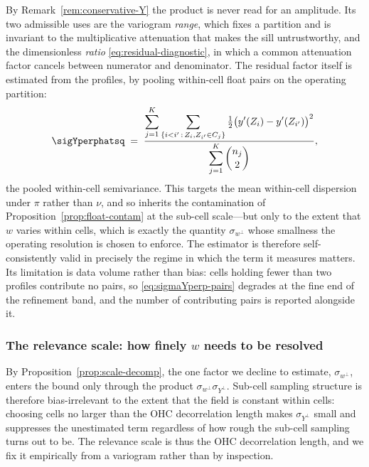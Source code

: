 By Remark~\ref{rem:conservative-Y} the product is never read for an
amplitude. Its two admissible uses are the variogram \emph{range}, which
fixes a partition and is invariant to the multiplicative attenuation that
makes the sill untrustworthy, and the dimensionless \emph{ratio}
\eqref{eq:residual-diagnostic}, in which a common attenuation factor
cancels between numerator and denominator. The residual factor itself is
estimated from the profiles, by pooling within-cell float pairs on the
operating partition:
\begin{equation}
  \sigYperphatsq
  \;=\;\frac{\displaystyle\sum_{j=1}^{K}
      \sum_{\{i<i'\,:\,Z_i,Z_{i'}\in C_j\}}
      \tfrac12\big(y'(Z_i)-y'(Z_{i'})\big)^2}
     {\displaystyle\sum_{j=1}^{K}\binom{n_j}{2}} ,
  \label{eq:sigmaYperp-pairs}
\end{equation}
the pooled within-cell semivariance. This targets the mean within-cell
dispersion under $\pi$ rather than $\nu$, and so inherits the
contamination of Proposition~\ref{prop:float-contam} at the sub-cell
scale---but only to the extent that $w$ varies within cells, which is
exactly the quantity $\sigma_{w^{\perp}}$ whose smallness the operating
resolution is chosen to enforce. The estimator is therefore
self-consistently valid in precisely the regime in which the term it
measures matters. Its limitation is data volume rather than bias: cells
holding fewer than two profiles contribute no pairs, so
\eqref{eq:sigmaYperp-pairs} degrades at the fine end of the refinement
band, and the number of contributing pairs is reported alongside it.

\subsubsection*{The relevance scale: how finely $w$ needs to be resolved}

By Proposition~\ref{prop:scale-decomp}, the one factor we decline to
estimate, $\sigma_{w^{\perp}}$, enters the bound only through the product
$\sigma_{w^{\perp}}\sigma_{Y^{\perp}}$. Sub-cell sampling structure is
therefore bias-irrelevant to the extent that the field is constant within
cells: choosing cells no larger than the OHC decorrelation length makes
$\sigma_{Y^{\perp}}$ small and suppresses the unestimated term regardless
of how rough the sub-cell sampling turns out to be. The relevance scale
is thus the OHC decorrelation length, and we fix it empirically from a
variogram rather than by inspection.

